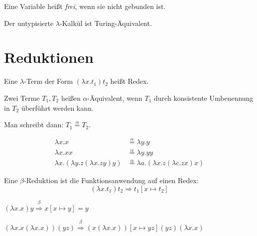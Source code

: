 \begin{definition}%
    Eine Variable heißt \textit{frei}, wenn sie nicht gebunden ist.
\end{definition}

\begin{satz}
    Der untypisierte $\lambda$-Kalkül ist Turing-Äquivalent.
\end{satz}

\section{Reduktionen}
\begin{definition}[Redex]%
    Eine $\lambda$-Term der Form $(\lambda x. t_1) t_2$ heißt Redex.
\end{definition}

\begin{definition}%
    Zwei Terme $T_1, T_2$ heißen $\alpha$-Äquivalent, wenn $T_1$ durch 
    konsistente Umbenennung in $T_2$ überführt werden kann.

    Man schreibt dann: $T_1 \overset{\alpha}{=} T_2$.
\end{definition}

\begin{beispiel}
    \begin{align*}
        \lambda x.x    &\overset{\alpha}{=} \lambda y. y\\
        \lambda x. x x &\overset{\alpha}{=} \lambda y. y y\\
        \lambda x. (\lambda y. z (\lambda x. z y) y) &\overset{\alpha}{=}
        \lambda a. (\lambda x. z (\lambda c. z x) x)
    \end{align*}
\end{beispiel}

\begin{definition}%
    Eine $\beta$-Reduktion ist die Funktionsanwendung auf einen Redex:
    \[(\lambda x. t_1) t_2 \Rightarrow t_1 [x \mapsto t_2]\]
\end{definition}

\begin{beispiel}
    \begin{defenum}
        \item $(\lambda x.x) y \overset{\beta}{\Rightarrow} x[x \mapsto y] = y$
        \item $(\lambda x. x (\lambda x. x)) (y z) \overset{\beta}{\Rightarrow} (x(\lambda x. x))[x \mapsto y z] (y z) (\lambda x. x)$
    \end{defenum}
\end{beispiel}

